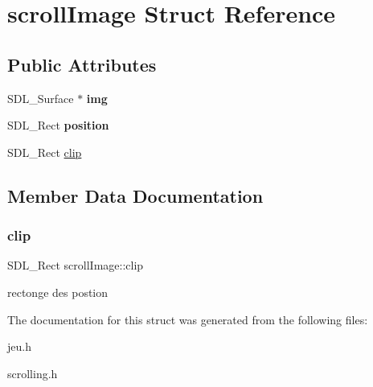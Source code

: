 \hypertarget{structscrollImage}{}\section{scroll\+Image Struct Reference}
\label{structscrollImage}
\subsection*{Public Attributes}
\begin{DoxyCompactItemize}
\item 
\mbox{\label{structscrollImage_aad27277a025e38bef976696fc79eda2e}} 
S\+D\+L\+\_\+\+Surface $\ast$ {\bfseries img}
\item 
\mbox{\label{structscrollImage_a37d0d769130b4c91f59677c412b2f3ce}} 
S\+D\+L\+\_\+\+Rect {\bfseries position}
\item 
S\+D\+L\+\_\+\+Rect \hyperlink{structscrollImage_a254bdc1d758b12ae66c7f83a02d2c769}{clip}
\end{DoxyCompactItemize}


\subsection{Member Data Documentation}
\mbox{\label{structscrollImage_a254bdc1d758b12ae66c7f83a02d2c769}} 
\subsubsection{\texorpdfstring{clip}{clip}}
{\footnotesize\ttfamily S\+D\+L\+\_\+\+Rect scroll\+Image\+::clip}

rectonge des postion 

The documentation for this struct was generated from the following files\+:\begin{DoxyCompactItemize}
\item 
jeu.\+h\item 
scrolling.\+h\end{DoxyCompactItemize}
